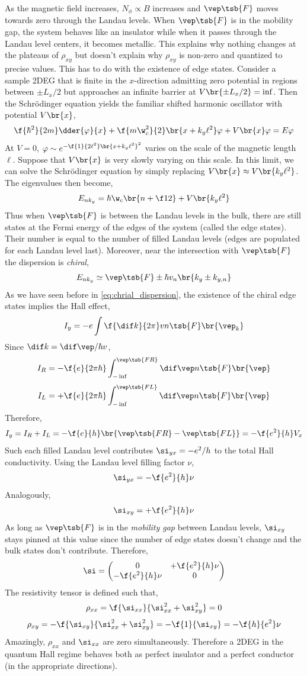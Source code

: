 \documentclass{article}
\newcommand{\vp}{\varphi}
\begin{document}
As the magnetic field increases, $N_{\phi} \propto B$ increases and $\vep\tsb{F}$ moves towards zero through the Landau levels. When $\vep\tsb{F}$ is in the mobility gap, the system behaves like an insulator while when it passes through the Landau level centers, it becomes metallic. This explains why nothing changes at the plateaus of $\rho_{xy}$ but doesn't explain why $\rho_{xy}$ is non-zero and quantized to precise values. This has to do with the existence of edge states. Consider a sample 2DEG that is finite in the $x$-direction admitting zero potential in regions between $\pm L_x / 2$ but approaches an infinite barrier at $V\br{\pm L_x / 2} = \inf$. Then the Schrödinger equation yields the familiar shifted harmonic oscillator with potential $V\br{x}$,
\[ \f{\hbar^2}{2m} \dder{\vp}{x} + \f{m\w_c^2}{2}\br{x + k_y \ell^2} \vp + V\br{x} \vp = E \vp \]
At $V = 0$, $\vp \sim e^{-\f{1}{2\ell^2}\br{x+k_y\ell^2}^2}$ varies on the scale of the magnetic length $\ell$. Suppose that $V\br{x}$ is very slowly varying on this scale. In this limit, we can solve the Schrödinger equation by simply replacing $V\br{x} \approx V\br{k_y \ell^2}$. The eigenvalues then become,
\[ E_{nk_y} = \hbar \w_c \br{n + \f12} + V\br{k_y \ell^2} \]
Thus when $\vep\tsb{F}$ is between the Landau levels in the bulk, there are still states at the Fermi energy of the edges of the system (called the edge states). Their number is equal to the number of filled Landau levels (edges are populated for each Landau level last). Moreover, near the intersection with $\vep\tsb{F}$ the dispersion is \textit{chiral},
\[ E_{n k_y} \simeq \vep\tsb{F}\pm\hbar v_n \br{k_y \pm k_{y,n}} \]
As we have seen before in \cref{eq:chrial_dispersion}, the existence of the chiral edge states implies the Hall effect,
\[ I_y = -e \int \f{\dif k}{2 \pi} v n\tsb{F}\br{\vep_k} \]
Since $\dif k = \dif \vep / \hbar v$,
\[ I_R = - \f{e}{2\pi \hbar}\int_{-\inf}^{\vep\tsb{FR}} \dif \vep n\tsb{F}\br{\vep} \]
\[ I_L = + \f{e}{2\pi \hbar}\int_{-\inf}^{\vep\tsb{FL}} \dif \vep n\tsb{F}\br{\vep} \]
Therefore,
\[ I_y = I_R + I_L = -\f{e}{h} \br{\vep\tsb{FR} - \vep\tsb{FL}} = -\f{e^2}{h}V_x \]
Such each filled Landau level contributes $\si_{yx} = - e^2 / h$ to the total Hall conductivity. Using the Landau level filling factor $\nu$,
\[ \si_{yx} = - \f{e^2}{h} \nu \]
Analogously,
\[ \si_{xy} = + \f{e^2}{h} \nu \]
As long as $\vep\tsb{F}$ is in the \textit{mobility gap} between Landau levels, $\si_{xy}$ stays pinned at this value since the number of edge states doesn't change and the bulk states don't contribute. Therefore,
\[ \si = \begin{pmatrix}
    0 & + \f{e^2}{h}\nu \\
    - \f{e^2}{h}\nu & 0 \\
\end{pmatrix} \]
The resistivity tensor is defined such that,
\[ \rho_{xx} = \f{\si_{xx}}{\si_{xx}^2 + \si_{xy}^2} = 0 \]
\[ \rho_{xy} = -\f{\si_{xy}}{\si_{xx}^2 +\si_{xy}^2} = - \f{1}{\si_{xy}} = - \f{h}{e^2} \nu \]
Amazingly, $\rho_{xx}$ and $\si_{xx}$ are zero simultaneously. Therefore a 2DEG in the quantum Hall regime behaves both as perfect insulator and a perfect conductor (in the appropriate directions).
\end{document}
